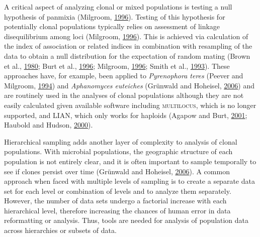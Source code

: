 \documentclass[double,12pt]{beavtex}
\begin{document}
  A critical aspect of analyzing clonal or mixed populations is testing a
  null hypothesis of panmixia (Milgroom,
  \protect\hyperlink{ref-milgroom1996recombination}{1996}). Testing of
  this hypothesis for potentially clonal populations typically relies on
  assessment of linkage disequilibrium among loci (Milgroom,
  \protect\hyperlink{ref-milgroom1996recombination}{1996}). This is
  achieved via calculation of the index of association or related indices
  in combination with resampling of the data to obtain a null distribution
  for the expectation of random mating (Brown et al.,
  \protect\hyperlink{ref-brown1980multilocus}{1980}; Burt et al.,
  \protect\hyperlink{ref-burt1996molecular}{1996}; Milgroom,
  \protect\hyperlink{ref-milgroom1996recombination}{1996}; Smith et al.,
  \protect\hyperlink{ref-smith1993how}{1993}). These approaches have, for
  example, been applied to \emph{Pyrenophora teres} (Peever and Milgroom,
  \protect\hyperlink{ref-peever1994genetic}{1994}) and \emph{Aphanomyces
  euteiches} (Grünwald and Hoheisel,
  \protect\hyperlink{ref-grunwald2006hierarchical}{2006}) and are
  routinely used in the analyses of clonal populations although they are
  not easily calculated given available software including
  \textsc{multilocus}, which is no longer supported, and \textsc{LIAN},
  which only works for haploids (Agapow and Burt,
  \protect\hyperlink{ref-Agapow_2001}{2001}; Haubold and Hudson,
  \protect\hyperlink{ref-Haubold:2000}{2000}).
  
  Hierarchical sampling adds another layer of complexity to analysis of
  clonal populations. With microbial populations, the geographic structure
  of each population is not entirely clear, and it is often important to
  sample temporally to see if clones persist over time (Grünwald and
  Hoheisel, \protect\hyperlink{ref-grunwald2006hierarchical}{2006}). A
  common approach when faced with multiple levels of sampling is to create
  a separate data set for each level or combination of levels and to
  analyze them separately. However, the number of data sets undergo a
  factorial increase with each hierarchical level, therefore increasing
  the chances of human error in data reformatting or analysis. Thus, tools
  are needed for analysis of population data across hierarchies or subsets
  of data.
  
\end{document}
